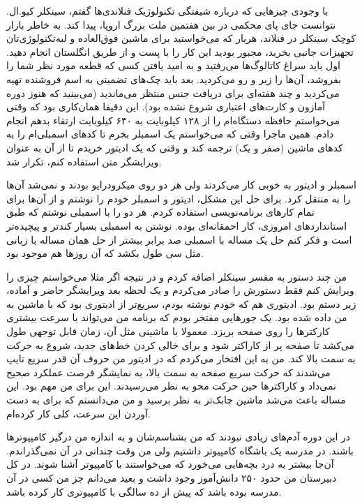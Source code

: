با وجودی چیزهایی که درباره شیفتگی تکنولوژیک فنلاندی‌ها گفتم، سینکلر
کیو.ال. نتوانست جای پای محکمی در بین هفتمین ملت بزرگ اروپا، پیدا
کند. به خاطر بازار کوچک سینکلر در فنلاند، هربار که می‌خواستید برای
ماشین فوق‌العاده و لبه‌تکنولوژی‌تان تجهیزات جانبی بخرید، مجبور بودید این
کار را با پست و از طریق انگلستان انجام دهید. اول باید سراغ کاتالوگ‌ها
می‌رفتید و به امید یافتن کسی که قطعه مورد نظر شما را بفروشد، آن‌ها را
زیر و رو می‌کردید. بعد باید چک‌های تضمینی به اسم فروشنده تهیه می‌کردید و
چند هفته‌ای برای دریافت جنس منتظر می‌ماندید (می‌بینید که هنوز دوره آمازون
و کارت‌های اعتباری شروع نشده بود). این دقیقا همان‌کاری بود که وقتی
می‌خواستم حافظه دستگاه‌ام را از ۱۲۸ کیلوبایت به ۶۴۰ کیلوبایت ارتقاء بدهم
انجام دادم. همین ماجرا وقتی که می‌خواستم یک اسمبلر بخرم تا کدهای
اسمبلی‌ام را به کدهای ماشین (صفر و یک) ترجمه کند و وقتی که یک ادیتور
خریدم تا از آن به عنوان ویرایشگر متن استفاده کنم،‌ تکرار شد.

اسمبلر و ادیتور به خوبی کار می‌کردند ولی هر دو روی میکرودرایو بودند و
نمی‌شد آن‌ها را به  منتقل کرد. برای حل این مشکل، ادیتور و اسمبلر
خودم را نوشتم و از آن‌ها برای تمام کارهای برنامه‌نویسی استفاده کردم. هر
دو را با اسمبلی نوشتم که طبق استانداردهای امروزی، کار احمقانه‌ای
بوده. نوشتن به اسمبلی بسیار کندتر و پیچیده‌تر است و فکر کنم حل یک مساله
با اسمبلی صد برابر بیشتر از حل همان مساله با زبانی مثل سی طول بکشد که
آن روزها هم موجود بود.

من چند دستور به مفسر سینکلر اضافه کردم و در نتیجه اگر مثلا می‌خواستم
چیزی را ویرایش کنم فقط دستورش را صادر می‌کردم و یک لحظه بعد ویرایشگر
حاضر و آماده، زیر دستم بود. ادیتوری هم که خودم نوشته بودم، سریع‌تر از
ادیتوری بود که با ماشین به من داده شده بود. یک جورهایی مفتخر بودم که
برنامه‌ من می‌تواند با سرعت بیشتری کارکترها را روی صفحه بریزد. معمولا با
ماشینی مثل آن، زمان قابل توجهی طول می‌کشد تا صفحه پر از کاراکتر شود و
برای خالی کردن خط‌های جدید، شروع به حرکت به سمت بالا کند. من به این
افتخار می‌کردم که در ادیتور من حروف آن قدر سریع تایپ می‌شدند که حرکت
سریع صفحه به سمت بالا، به نمایشگر فرصت عملکرد صحیح نمی‌داد و کاراکترها
حین حرکت محو به نظر می‌رسیدند. این برای من مهم بود. این مساله باعث می‌شد
ماشین چابک‌تر به نظر برسید و من می‌دانستم که برای به دست آوردن این سرعت،
کلی کار کرده‌ام.

در این دوره آدم‌های زیادی نبودند که من بشناسم‌شان و به اندازه‌ من درگیر
کامپیوترها باشند. در مدرسه یک باشگاه کامپیوتر داشتیم ولی من وقت چندانی
در آن نمی‌گذراندم. آن‌جا بیشتر به درد بچه‌هایی می‌خورد که می‌خواستند با
کامپیوتر آشنا شوند. در کل دبیرستان من حدود ۲۵۰ دانش‌آموز وجود داشت و
بعید می‌دانم جز من کسی در آن مدرسه بوده باشد که پیش از ده سالگی با
کامپیوتری کار کرده باشد.

